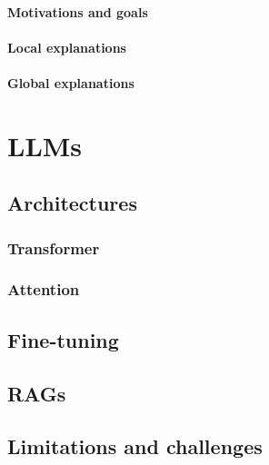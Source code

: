 \documentclass[12pt,a4paper,openright,twoside]{book}
\begin{document}
\subsubsection{Motivations and goals}\label{subsubsec:ske-motivations-and-goals}

\subsubsection{Local explanations}\label{subsubsec:local-explanations}

\subsubsection{Global explanations}\label{subsubsec:global-explanations}


\chapter{\Aclp{LLM}}\label{ch:llm}

\section{Architectures}\label{sec:llm-architectures}

\subsection{Transformer}\label{subsec:transformer}

\subsection{Attention}\label{subsec:attention}

\section{Fine-tuning}\label{sec:llm-fine-tuning}

\section{\Acp{RAG}}\label{sec:rag}

\section{Limitations and challenges}\label{sec:limitations-and-challenges}
\end{document}
